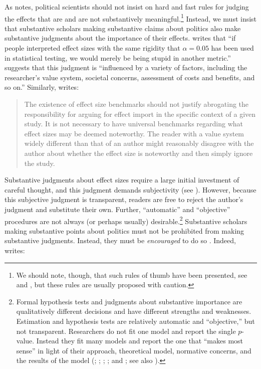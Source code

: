 \documentclass[12pt]{article}
\begin{document}
As \cite{Rainey2014a} notes, political scientists should not insist on hard and fast rules for judging the effects that are and are not substantively meaningful.\footnote{We should note, though, that such rules of thumb have been presented, see \cite{Glass1976} and \cite{Cohen1992}, but these rules are usually proposed with caution.} Instead, we must insist that substantive scholars making substantive claims about politics also make substantive judgments about the importance of their effects. \citet[pp. 82-83]{Thompson2001} writes that ``if people interpreted effect sizes with the same rigidity that $\alpha = 0.05$ has been used in statistical testing, we would merely be being stupid in another metric.'' \cite{Kirk1996} suggests that this judgment is ``influenced by a variety of factors, including the researcher's value system, societal concerns, assessment of costs and benefits, and so on.'' Similarly, \citet[p. 30]{Thompson2002} writes: 

\begin{quote}
The existence of effect size benchmarks should not justify abrogating the responsibility for arguing for effect import in the specific context of a given study. It is not necessary to have universal benchmarks regarding what effect sizes may be deemed noteworthy. The reader with a value system widely different than that of an author might reasonably disagree with the author about whether the effect size is noteworthy and then simply ignore the study.
\end{quote}

Substantive judgments about effect sizes require a large initial investment of careful thought, and this judgment demands subjectivity (see \citealt{Rainey2014a}). However, because this subjective judgment is transparent, readers are free to reject the author's judgment and substitute their own. Further, ``automatic'' and ``objective'' procedures are not always (or perhaps usually) desirable.\footnote{Formal hypothesis tests and judgments about substantive importance are qualitatively different decisions and have different strengths and weaknesses. Estimation and hypothesis tests are relatively automatic and ``objective,'' but not transparent. Researchers do not fit one model and report the single $p$-value. Instead they fit many models and report the one that ``makes most sense'' in light of their approach, theoretical model, normative concerns, and the results of the model (\citealt{GerberMalhotra2008}; \citealt{SimmonsNelsonSimonsohn2011}; \citealt{Francis2013}; \citealt{SimmonsNelsonSimonsohn2014}; and \citealt{EsareyWu2014}; see also \citealt{GelmanLoken2014}).} Substantive scholars making substantive points about politics must not be prohibited from making substantive judgments. Instead, they must be \emph{encouraged} to do so \citep{Achen1982}. Indeed, \citet[p. 755]{Kirk1996} writes:
\end{document}
